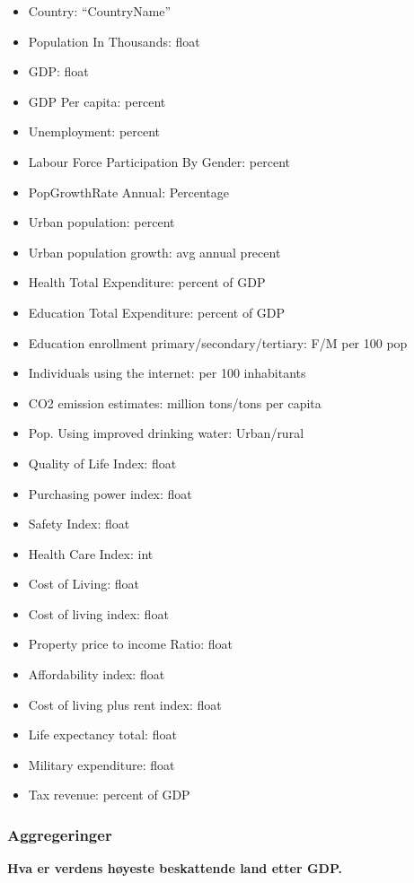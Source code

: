 \begin{itemize}
  \item Country: “CountryName”
  \item Population In Thousands: float
  \item GDP: float
  \item GDP Per capita: percent
  \item Unemployment: percent
  \item Labour Force Participation By Gender: percent
  \item PopGrowthRate Annual: Percentage
  \item Urban population: percent
  \item Urban population growth: avg annual precent%
  \item Health Total Expenditure: percent of GDP
  \item Education Total Expenditure: percent of GDP
  \item Education enrollment primary/secondary/tertiary: F/M per 100 pop
  \item Individuals using the internet: per 100 inhabitants
  \item CO2 emission estimates: million tons/tons per capita
  \item Pop. Using improved drinking water: Urban/rural %
  \item Quality of Life Index: float
  \item Purchasing power index: float
  \item Safety Index: float
  \item Health Care Index: int
  \item Cost of Living: float
  \item Cost of living index: float
  \item Property price to income Ratio: float
  \item Affordability index: float
  \item Cost of living plus rent index: float
  \item Life expectancy total: float
  \item Military expenditure: float
  \item Tax revenue: percent of GDP
\end{itemize}

\subsubsection{Aggregeringer}
\textbf{Hva er verdens høyeste beskattende land etter GDP.}

